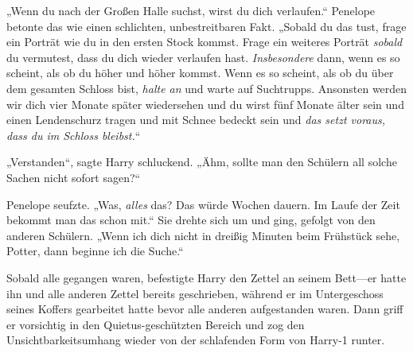 „Wenn du nach der Großen Halle suchst, wirst du dich verlaufen.“ Penelope betonte das wie einen schlichten, unbestreitbaren Fakt. „Sobald du das tust, frage ein Porträt wie du in den ersten Stock kommst. Frage ein weiteres Porträt \emph{sobald} du vermutest, dass du dich wieder verlaufen hast. \emph{Insbesondere} dann, wenn es so scheint, als ob du höher und höher kommst. Wenn es so scheint, als ob du über dem gesamten Schloss bist, \emph{halte an} und warte auf Suchtrupps. Ansonsten werden wir dich vier Monate später wiedersehen und du wirst fünf Monate älter sein und einen Lendenschurz tragen und mit Schnee bedeckt sein und \emph{das setzt voraus, dass du im Schloss bleibst.}“

„Verstanden“, sagte Harry schluckend. „Ähm, sollte man den Schülern all solche Sachen nicht sofort sagen?“

Penelope seufzte. „Was, \emph{alles} das? Das würde Wochen dauern. Im Laufe der Zeit bekommt man das schon mit.“ Sie drehte sich um und ging, gefolgt von den anderen Schülern. „Wenn ich dich nicht in dreißig Minuten beim Frühstück sehe, Potter, dann beginne ich die Suche.“

Sobald alle gegangen waren, befestigte Harry den Zettel an seinem Bett—er hatte ihn und alle anderen Zettel bereits geschrieben, während er im Untergeschoss seines Koffers gearbeitet hatte bevor alle anderen aufgestanden waren. Dann griff er vorsichtig in den Quietus-geschützten Bereich und zog den Unsichtbarkeitsumhang wieder von der schlafenden Form von Harry-1 runter.

